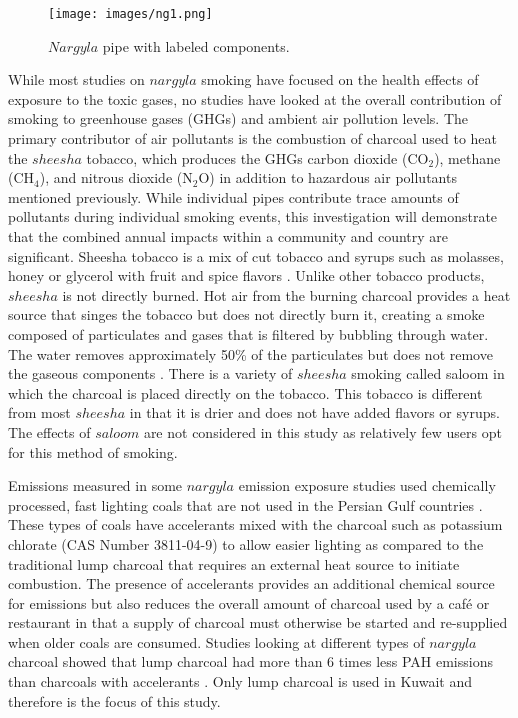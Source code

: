 %
\begin{figure}[H]
\texttt{[image: images/ng1.png]} 
\caption{$Nargyla$ pipe with labeled components.}
\label{figng1:pipe}
\end{figure}
%
While most studies on $nargyla$ smoking have focused on the health effects of exposure to the toxic gases, no studies have looked at the overall contribution of smoking to greenhouse gases (GHGs) and ambient air pollution levels.  The primary contributor of air pollutants is the combustion of charcoal used to heat the $sheesha$ tobacco, which produces the GHGs carbon dioxide (CO$_{2}$), methane (CH$_{4}$), and nitrous dioxide (N$_{2}$O) in addition to hazardous air pollutants mentioned previously.  While individual pipes contribute trace amounts of pollutants during individual smoking events, this investigation will demonstrate that the combined annual impacts within a community and country are significant.
Sheesha tobacco is a mix of cut tobacco and syrups such as molasses, honey or glycerol with fruit and spice flavors \citep{Chaouachi2009}.  Unlike other tobacco products, $sheesha$ is not directly burned. Hot air from the burning charcoal provides a heat source that singes the tobacco but does not directly burn it, creating a smoke composed of particulates and gases \citep{Daher2010} that is filtered by bubbling through water.  The water removes approximately 50\% of the particulates but does not remove the gaseous components \citep{Becquemin2008}. There is a variety of $sheesha$ smoking called saloom in which the charcoal is placed directly on the tobacco. This tobacco is different from most $sheesha$ in that it is drier and does not have added flavors or syrups. The effects of $saloom$ are not considered in this study as relatively few users opt for this method of smoking.

Emissions measured in some $nargyla$ emission exposure studies used chemically processed, fast lighting coals that are not used in the Persian Gulf countries \citep{Daher2010, Shihadeh2005}.  These types of coals have accelerants mixed with the charcoal such as potassium chlorate (CAS Number 3811-04-9) \citep{MIC2012} to allow easier lighting as compared to the traditional lump charcoal that requires an external heat source to initiate combustion.  The presence of accelerants provides an additional chemical source for emissions but also reduces the overall amount of charcoal used by a caf\'e or restaurant in that a supply of charcoal must otherwise be started and re-supplied when older coals are consumed. Studies looking at different types of $nargyla$ charcoal showed that lump charcoal had more than 6 times less PAH emissions than charcoals with accelerants \citep{Sepetdjian2010}.  Only lump charcoal is used in Kuwait and therefore is the focus of this study.

